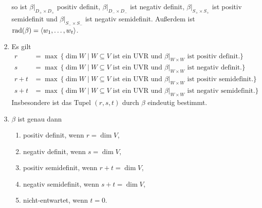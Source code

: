 \begin{corollary}
\begin{enumerate}[leftmargin=*, label=\roman*)]
      so ist $\beta|_{D_+ \times D_+}$ positiv definit, $\beta|_{D_- \times D_-}$ ist negativ definit, $\beta|_{S_+ \times S_+}$ ist positiv semidefinit und $\beta|_{S_- \times S_-}$ ist negativ semidefinit.
      Außerdem ist $\operatorname{rad}(\beta) = \left\langle w_1, \dotsc, w_t \right\rangle$.
    \item
      Es gilt
      \begin{align*}
        r
        &=
        \max\,
        \{
          \dim W
          \mid
          \text{$W \subseteq V$ ist ein UVR und $\beta|_{W \times W}$ ist positiv definit}.
        \}
        \\
        s
        &=
        \max\,
        \{
          \dim W
          \mid
          \text{$W \subseteq V$ ist ein UVR und $\beta|_{W \times W}$ ist negativ definit}.
        \}
        \\
        r+t
        &=
        \max\,
        \{
          \dim W
          \mid
          \text{$W \subseteq V$ ist ein UVR und $\beta|_{W \times W}$ ist positiv semidefinit}.
        \}
        \\
        s+t
        &=
        \max\,
        \{
          \dim W
          \mid
          \text{$W \subseteq V$ ist ein UVR und $\beta|_{W \times W}$ ist negativ semidefinit}.
        \}
      \end{align*}
      Insbesondere ist das Tupel $(r,s,t)$ durch $\beta$ eindeutig bestimmt.
    \item
      $\beta$ ist genau dann
      \begin{enumerate}[leftmargin=*, label=\alph*)]
        \item
          positiv definit, wenn $r = \dim V$,
        \item
          negativ definit, wenn $s = \dim V$,
        \item
          positiv semidefinit, wenn $r + t = \dim V$,
        \item
          negativ semidefinit, wenn $s + t = \dim V$,
        \item
          nicht-entwartet, wenn $t = 0$.
      \end{enumerate}
  \end{enumerate}
\end{corollary}



















































